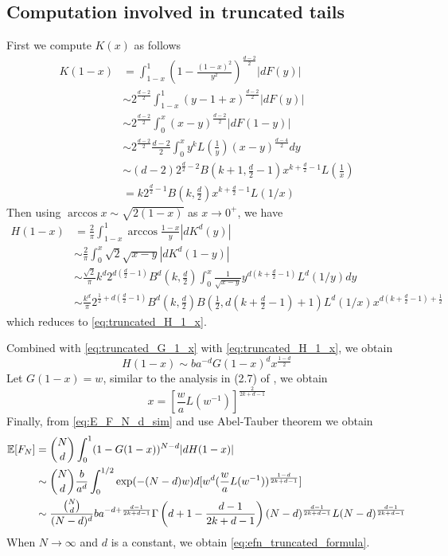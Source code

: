 \documentclass{aptpub}
\def\E{\mathbb{E}}
\begin{document}
\subsection{Computation involved in truncated tails}
First we compute $K(x)$ as follows
\begin{align*}
    K(1-x)  & = \int_{1-x}^1 (1-\frac{(1-x)^2}{y^2})^{\frac{d-2}{2}} |dF(y)| \\
    & \sim 2^{\frac{d-2}{2}} \int_{1-x}^1 (y-1+x)^{\frac{d-2}{2}} |dF(y)| \\
    & \sim 2^{\frac{d-2}{2}} \int_0^x (x-y)^{\frac{d-2}{2}} |dF(1-y)| \\
    & \sim 2^{\frac{d-2}{2}} \frac{d-2}{2} \int_0^x y^k L(\frac{1}{y}) (x-y)^{\frac{d-4}{2}} dy\\
    & \sim (d-2)2^{\frac{d}{2}-2} B(k+1,\frac{d}{2}-1)x^{k+\frac{d}{2}-1}L(\frac{1}{x})\\
    & = k 2^{\frac{d}{2}-1} B(k, \frac{d}{2}) x^{k+\frac{d}{2}-1} L(1/x) 
\end{align*}
Then using $\arccos x \sim \sqrt{2(1-x)}$ as $x\to 0^+$,
we have
\begin{align*}
     H(1-x) & = \frac{2}{\pi} \int_{1-x}^{1}
     \arccos\frac{1-x}{y}
     |d K^d(y)| \\
     &\sim \frac{2}{\pi}\int_0^x \sqrt{2}\sqrt{x-y} |dK^d(1-y)| \\
     &\sim \frac{\sqrt{2}}{\pi} k^d
     2^{d(\frac{d}{2}-1)} B^d(k, \frac{d}{2})
      \int_0^x \frac{1}{\sqrt{x-y}} y^{d(k+\frac{d}{2}-1)} L^d(1/y) dy\\
     &\sim \frac{k^d}{\pi}
     2^{\frac{1}{2} + d(\frac{d}{2}-1)} B^d(k, \frac{d}{2})
     B\left( \frac{1}{2},
     d(k+\frac{d}{2} -1)+1 \right) L^d(1/x) x^{d(k+\frac{d}{2}-1)+\frac{1}{2}}
\end{align*}
which reduces to \eqref{eq:truncated_H_1_x}.

Combined with \eqref{eq:truncated_G_1_x} with \eqref{eq:truncated_H_1_x}, we obtain
\begin{equation}
    H(1-x) \sim ba^{-d} G(1-x)^d x^{\frac{1-d}{2}}
\end{equation}
Let $G(1-x)=w$, similar to the analysis in (2.7) of
\cite{carnal1970konvexe}, we obtain
\begin{equation*}
     x = [\frac{w}{a} L(w^{-1})]^{\frac{2}{2k+d-1}} 
\end{equation*}
Finally, from \eqref{eq:E_F_N_d_sim}
and use Abel-Tauber theorem
\cite{omey1989abelian} we obtain
\begin{align}
    \E[F_N] &= \binom{N}{d}\int_0^1 (1 - G(1-x))^{N-d} |dH(1-x)| 
    \notag \\
    & \sim \binom{N}{d} \frac{b}{a^d} \int_0^{1/2} \exp(-(N-d)w) d[w^d (\frac{w}{a} L(w^{-1}))^{\frac{1-d}{2k+d-1}} ]
    \notag \\
    &\sim \frac{\binom{N}{d}}{(N-d)^d} ba^{-d+\frac{d-1}{2k+d-1}}
    \Gamma 
    \left(d+1-\frac{d-1}{2k+d-1}\right)
    (N-d)^{\frac{d-1}{2k+d-1}}
    L(N-d)
    ^{\frac{d-1}{2k+d-1}}
    \label{eq:intermediate_efn_truncated}
\end{align}
When $N\to \infty$ and $d$ is a constant, we obtain \eqref{eq:efn_truncated_formula}.
\end{document}
